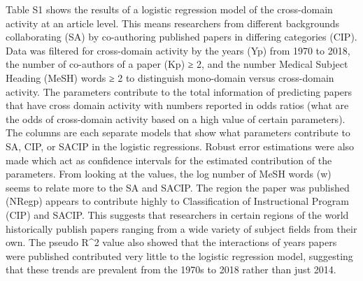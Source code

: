 \documentclass[
]{article}
\begin{document}
Table S1 shows the results of a logistic regression model of the
cross-domain activity at an article level. This means researchers from
different backgrounds collaborating (SA) by co-authoring published
papers in differing categories (CIP). Data was filtered for cross-domain
activity by the years (Yp) from 1970 to 2018, the number of co-authors
of a paper (Kp) ≥ 2, and the number Medical Subject Heading (MeSH) words
≥ 2 to distinguish mono-domain versus cross-domain activity. The
parameters contribute to the total information of predicting papers that
have cross domain activity with numbers reported in odds ratios (what
are the odds of cross-domain activity based on a high value of certain
parameters). The columns are each separate models that show what
parameters contribute to SA, CIP, or SACIP in the logistic regressions.
Robust error estimations were also made which act as confidence
intervals for the estimated contribution of the parameters. From looking
at the values, the log number of MeSH words (w) seems to relate more to
the SA and SACIP. The region the paper was published (NRegp) appears to
contribute highly to Classification of Instructional Program (CIP) and
SACIP. This suggests that researchers in certain regions of the world
historically publish papers ranging from a wide variety of subject
fields from their own. The pseudo R\^{}2 value also showed that the
interactions of years papers were published contributed very little to
the logistic regression model, suggesting that these trends are
prevalent from the 1970s to 2018 rather than just 2014.
\end{document}
